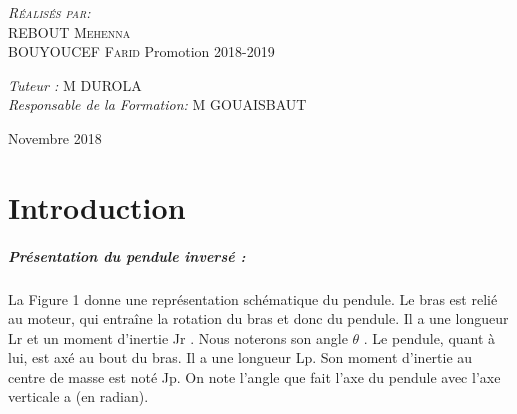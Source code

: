 \documentclass[12pt, a4paper, openany]{report}
\begin{document}
\begin{titlepage}
\begin{sffamily}
\begin{center}
    \begin{minipage}{0.4\textwidth}
      \begin{flushleft} \large
         \textsc{\emph {Réalisés par:} \\REBOUT Mehenna}\\
         \textsc{BOUYOUCEF Farid}   
          \newline
          Promotion 2018-2019 \\
      \end{flushleft}
    \end{minipage}
    \begin{minipage}{0.4\textwidth}
      \begin{flushright} \large
        \emph{Tuteur :}  \textsc{M DUROLA}\\
        \emph{Responsable de la Formation:} \textsc{M GOUAISBAUT}
      \end{flushright}
    \end{minipage}

    \vfill

    {\large Novembre 2018}

  \end{center}
  \end{sffamily}      
          
  \end{titlepage}
  
\makeatother




   
\renewcommand{\contentsname}{Sommaire}
\tableofcontents
\listoffigures
\listoftables



\chapter*{Introduction}

\paragraph{Présentation du pendule inversé :} La Figure 1 donne une représentation schématique du pendule. Le bras est relié au moteur, qui entraîne la rotation du bras et donc du pendule. Il a une longueur L{r} et un moment d'inertie J{r} . Nous noterons son angle $\theta$ . Le pendule, quant à lui, est axé au bout du bras. Il a une longueur L{p}. Son moment d'inertie au centre de masse est noté J{p}. On note l'angle que fait l'axe du pendule avec l'axe verticale a (en radian).
\end{document}
